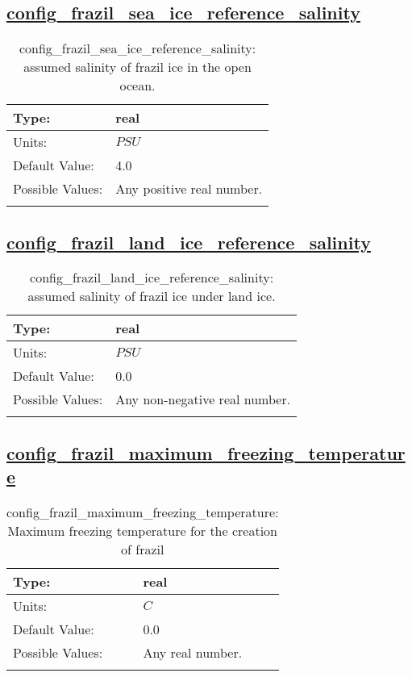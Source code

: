 \subsection[config\_frazil\_sea\_ice\_reference\_salinity]{\hyperref[sec:nm_tab_frazil_ice]{config\_frazil\_sea\_ice\_reference\_salinity}}
\label{subsec:nm_sec_config_frazil_sea_ice_reference_salinity}
\begin{center}
\begin{longtable}{| p{2.0in} || p{4.0in} |}
    \hline
    Type: & real \\
    \hline
    Units: & $PSU$ \\
    \hline
    Default Value: & 4.0 \\
    \hline
    Possible Values: & Any positive real number. \\
    \hline
    \caption{config\_frazil\_sea\_ice\_reference\_salinity: assumed salinity of frazil ice in the open ocean.}
\end{longtable}
\end{center}
\subsection[config\_frazil\_land\_ice\_reference\_salinity]{\hyperref[sec:nm_tab_frazil_ice]{config\_frazil\_land\_ice\_reference\_salinity}}
\label{subsec:nm_sec_config_frazil_land_ice_reference_salinity}
\begin{center}
\begin{longtable}{| p{2.0in} || p{4.0in} |}
    \hline
    Type: & real \\
    \hline
    Units: & $PSU$ \\
    \hline
    Default Value: & 0.0 \\
    \hline
    Possible Values: & Any non-negative real number. \\
    \hline
    \caption{config\_frazil\_land\_ice\_reference\_salinity: assumed salinity of frazil ice under land ice.}
\end{longtable}
\end{center}
\subsection[config\_frazil\_maximum\_freezing\_temperature]{\hyperref[sec:nm_tab_frazil_ice]{config\_frazil\_maximum\_freezing\_temperature}}
\label{subsec:nm_sec_config_frazil_maximum_freezing_temperature}
\begin{center}
\begin{longtable}{| p{2.0in} || p{4.0in} |}
    \hline
    Type: & real \\
    \hline
    Units: & $C$ \\
    \hline
    Default Value: & 0.0 \\
    \hline
    Possible Values: & Any real number. \\
    \hline
    \caption{config\_frazil\_maximum\_freezing\_temperature: Maximum freezing temperature for the creation of frazil}
\end{longtable}
\end{center}
